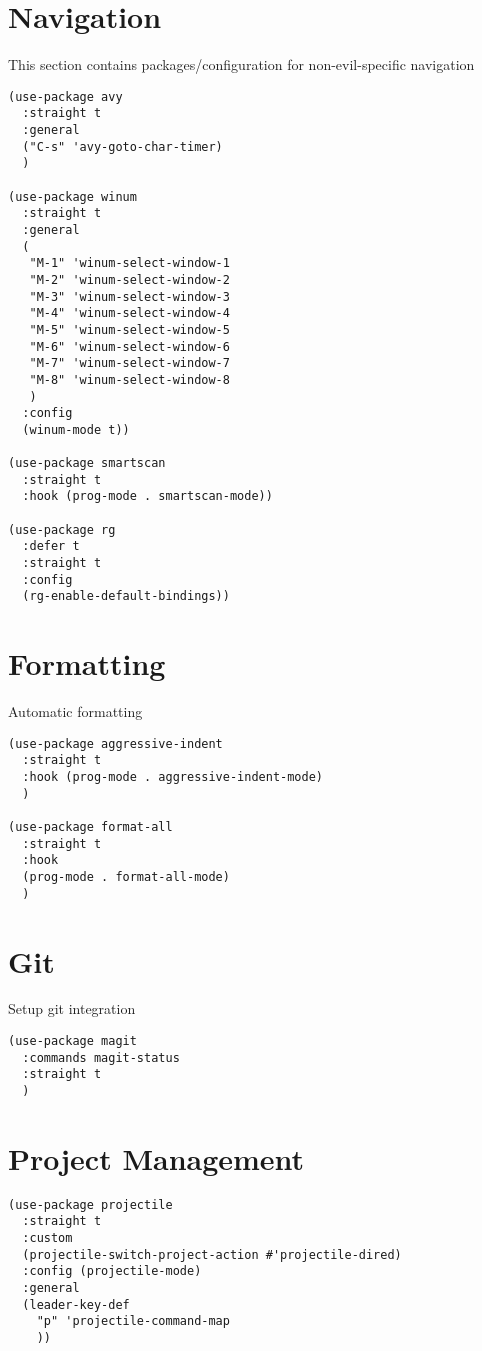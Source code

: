 \documentclass[11pt]{article}
\begin{document}
\section{Navigation}
\label{sec:orgfe2293a}
This section contains packages/configuration for
non-evil-specific navigation
\begin{verbatim}
(use-package avy
  :straight t
  :general
  ("C-s" 'avy-goto-char-timer)
  )

(use-package winum
  :straight t
  :general
  (
   "M-1" 'winum-select-window-1
   "M-2" 'winum-select-window-2
   "M-3" 'winum-select-window-3
   "M-4" 'winum-select-window-4
   "M-5" 'winum-select-window-5
   "M-6" 'winum-select-window-6
   "M-7" 'winum-select-window-7
   "M-8" 'winum-select-window-8
   )
  :config
  (winum-mode t))

(use-package smartscan
  :straight t
  :hook (prog-mode . smartscan-mode))

(use-package rg
  :defer t
  :straight t
  :config
  (rg-enable-default-bindings))
\end{verbatim}

\section{Formatting}
\label{sec:org055a2ac}
Automatic formatting
\begin{verbatim}
(use-package aggressive-indent
  :straight t
  :hook (prog-mode . aggressive-indent-mode)
  )

(use-package format-all
  :straight t
  :hook
  (prog-mode . format-all-mode)
  )
\end{verbatim}

\section{Git}
\label{sec:org19c2421}
Setup git integration
\begin{verbatim}
(use-package magit
  :commands magit-status
  :straight t
  )
\end{verbatim}

\section{Project Management}
\label{sec:org5d9da8d}
\begin{verbatim}
(use-package projectile
  :straight t
  :custom
  (projectile-switch-project-action #'projectile-dired)
  :config (projectile-mode)
  :general
  (leader-key-def
    "p" 'projectile-command-map
    ))
\end{verbatim}
\end{document}
